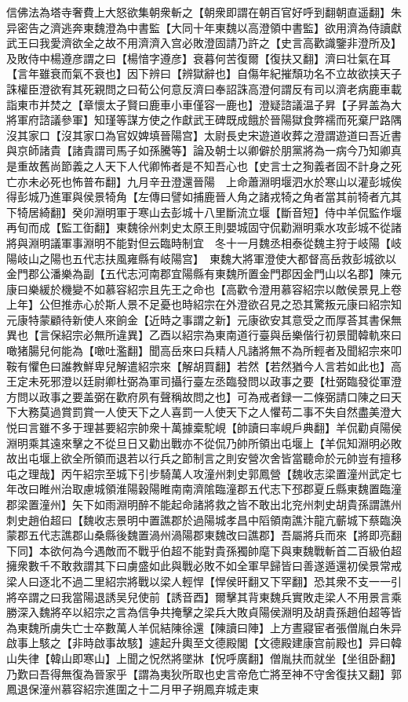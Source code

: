 信佛法為塔寺奢費上大怒欲集朝衆斬之【朝衆即謂在朝百官好呼到翻朝直遥翻】朱异密告之濟逃奔東魏澄為中書監【大同十年東魏以高澄領中書監】欲用濟為侍讀獻武王曰我愛濟欲全之故不用濟濟入宫必敗澄固請乃許之【史言高歡識鑒非澄所及】及敗侍中楊遵彦謂之曰【楊愔字遵彦】衰暮何苦復爾【復扶又翻】濟曰壮氣在耳【言年雖衰而氣不衰也】因下辨曰【辨獄辭也】自傷年紀摧頹功名不立故欲挟天子誅權臣澄欲宥其死親問之曰荀公何意反濟曰奉詔誅高澄何謂反有司以濟老病鹿車載詣東市并焚之【章懷太子賢曰鹿車小車僅容一鹿也】澄疑諮議温子昇【子昇盖為大將軍府諮議參軍】知瑾等謀方使之作獻武王碑既成餓於晉陽獄食弊襦而死棄尸路隅沒其家口【沒其家口為官奴婢填晉陽宫】太尉長史宋遊道收葬之澄謂遊道曰吾近書與京師諸貴【諸貴謂司馬子如孫騰等】論及朝士以卿僻於朋黨將為一病今乃知卿真是重故舊尚節義之人天下人代卿怖者是不知吾心也【史言士之狥義者固不計身之死亡亦未必死也怖普布翻】九月辛丑澄還晉陽　上命蕭淵明堰泗水於寒山以灌彭城俟得彭城乃進軍與侯景犄角【左傳曰譬如捕鹿晉人角之諸戎犄之角者當其前犄者亢其下犄居綺翻】癸卯淵明軍于寒山去彭城十八里斷流立堰【斷音短】侍中羊侃監作堰再旬而成【監工衘翻】東魏徐州刺史太原王則嬰城固守侃勸淵明乘水攻彭城不從諸將與淵明議軍事淵明不能對但云臨時制宜　冬十一月魏丞相泰從魏主狩于岐陽【岐陽岐山之陽也五代志扶風雍縣有岐陽宫】　東魏大將軍澄使大都督高岳救彭城欲以金門郡公潘樂為副【五代志河南郡宜陽縣有東魏所置金門郡因金門山以名郡】陳元康曰樂緩於機變不如慕容紹宗且先王之命也【高歡令澄用慕容紹宗以敵侯景見上卷上年】公但推赤心於斯人景不足憂也時紹宗在外澄欲召見之恐其驚叛元康曰紹宗知元康特蒙顧待新使人來餉金【近時之事謂之新】元康欲安其意受之而厚荅其書保無異也【言保紹宗必無所違異】乙酉以紹宗為東南道行臺與岳樂偕行初景聞韓軌來曰噉猪腸兒何能為【噉吐濫翻】聞高岳來曰兵精人凡諸將無不為所輕者及聞紹宗來叩鞍有懼色曰誰教鮮卑兒解遣紹宗來【解胡買翻】若然【若然猶今人言若如此也】高王定未死邪澄以廷尉卿杜弼為軍司攝行臺左丞臨發問以政事之要【杜弼臨發從軍澄方問以政事之要盖弼在歡府夙有聲稱故問之也】可為戒者録一二條弼請口陳之曰天下大務莫過賞罰賞一人使天下之人喜罰一人使天下之人懼苟二事不失自然盡美澄大悦曰言雖不多于理甚要紹宗帥衆十萬據槖駝峴【帥讀曰率峴戶典翻】羊侃勸貞陽侯淵明乘其遠來擊之不從旦日又勸出戰亦不從侃乃帥所領出屯堰上【羊侃知淵明必敗故出屯堰上欲全所領而退若以行兵之節制言之則安營次舍皆當聽命於元帥豈有擅移屯之理哉】丙午紹宗至城下引步騎萬人攻潼州刺史郭鳳營【魏收志梁置潼州武定七年改曰睢州治取慮城領淮陽穀陽睢南南濟隂臨潼郡五代志下邳郡夏丘縣東魏置臨潼郡梁置潼州】矢下如雨淵明醉不能起命諸將救之皆不敢出北兖州刺史胡貴孫謂譙州刺史趙伯超曰【魏收志景明中置譙郡於過陽城孝昌中䧟領南譙汴龍亢蘄城下蔡臨涣蒙郡五代志譙郡山桑縣後魏置渦州渦陽郡東魏改曰譙郡】吾屬將兵而來【將即亮翻下同】本欲何為今遇敵而不戰乎伯超不能對貴孫獨帥麾下與東魏戰斬首二百級伯超擁衆數千不敢救謂其下曰虜盛如此與戰必敗不如全軍早歸皆曰善遂遁還初侯景常戒梁人曰逐北不過二里紹宗將戰以梁人輕悍【悍侯旰翻又下罕翻】恐其衆不支一一引將卒謂之曰我當陽退誘吴兒使前【誘音酉】爾擊其背東魏兵實敗走梁人不用景言乘勝深入魏將卒以紹宗之言為信争共掩擊之梁兵大敗貞陽侯淵明及胡貴孫趙伯超等皆為東魏所虜失亡士卒數萬人羊侃結陳徐還【陳讀曰陣】上方晝寢宦者張僧胤白朱异啟事上駭之【非時啟事故駭】遽起升輿至文德殿閣【文德殿建康宫前殿也】异曰韓山失律【韓山即寒山】上聞之怳然將墜牀【怳呼廣翻】僧胤扶而就坐【坐徂卧翻】乃歎曰吾得無復為晉家乎【謂為夷狄所取也史言帝危亡將至神不守舍復扶又翻】郭鳳退保潼州慕容紹宗進圍之十二月甲子朔鳳弃城走東